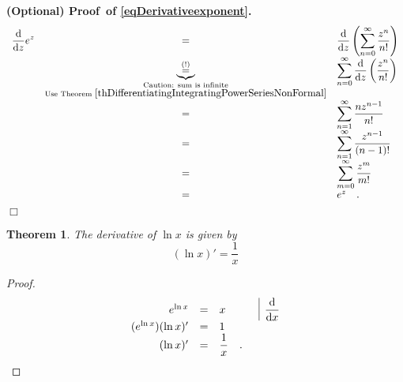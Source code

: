 \documentclass[12pt]{book}
\newcommand{\eqAttention}{\stackrel{(!)}{=}}
\newenvironment{proofOptional}[1][]{ \noindent \textbf{(Optional) Proof#1.}}{$\Box$\medskip}
\newtheorem{theorem}{Theorem}[section]
\begin{document}
\begin{proofOptional}[~of \eqref{eqDerivativeexponent}]
\[
\begin{array}{rcl}
\displaystyle \frac{\diff}{\diff z}e^z &=&\displaystyle  \frac{\diff}{\diff z}\left( \sum_{n=0}^{\infty} \frac{z^n}{n!}\right)\\
&\underbrace{\eqAttention}_{\substack{\text{Caution: sum is infinite}\\\text{Use Theorem }\ref{thDifferentiatingIntegratingPowerSeriesNonFormal} }} &\displaystyle \sum_{n=0}^{\infty} \frac{\diff}{\diff z} \left( \frac{z^n}{n!}\right)\\
&=&\displaystyle \sum_{n=1}^{\infty} \frac {nz^{n-1}}{n!}\\
&=&\displaystyle \sum_{n=1}^{\infty} \frac {z^{n-1}}{(n-1)!} \\
&=&\displaystyle \sum_{m=0}^{\infty} \frac {z^{m}}{m!}\\
&=&e^z\quad .
\end{array}
\]
\end{proofOptional}

\begin{theorem}
The derivative of $\ln x$ is given by
\begin{equation}\boxed{
(\ln x)' = \frac{1}x
}
\end{equation}
\end{theorem}
\begin{proof}
\[
\begin{array}{rcll|l}
e^{\ln x}&=& x  &&\displaystyle  \frac {{\normalfont \text{d}}}{{\normalfont \text{d}} x}\\
(e^{\ln x})(\ln x)' &= &1\\
 (\ln x)' &=& \displaystyle \frac{1}x\quad .
\end{array}
\]
\end{proof}
\end{document}
